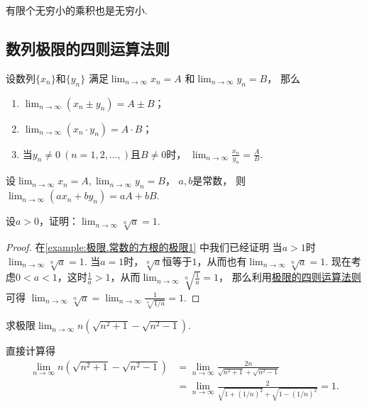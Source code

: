 \begin{corollary}
有限个无穷小的乘积也是无穷小.
\end{corollary}

\subsection{数列极限的四则运算法则}
\begin{theorem}\label{theorem:极限.数列极限的四则运算法则}
设数列\(\{x_n\}\)和\(\{y_n\}\)
满足\(\lim_{n\to\infty} x_n = A\)
和\(\lim_{n\to\infty} y_n = B\)，
那么\begin{enumerate}
	\item \(\lim_{n\to\infty} (x_n \pm y_n) = A \pm B\)；
	\item \(\lim_{n\to\infty} (x_n \cdot y_n) = A \cdot B\)；
	\item 当\(y_n \neq 0\ (n=1,2,\dotsc,)\)且\(B \neq 0\)时，
	\(\lim_{n\to\infty}{\frac{x_n}{y_n}}=\frac{A}{B}\).
\end{enumerate}
\end{theorem}

\begin{corollary}
设\(\lim_{n\to\infty} x_n = A,
\lim_{n\to\infty} y_n = B\)，
\(a,b\)是常数，
则\(\lim_{n\to\infty} (a x_n + b y_n) = a A + b B\).
\end{corollary}

\begin{example}
设\(a>0\)，证明：\(\lim_{n\to\infty} \sqrt[n]{a} = 1\).
\begin{proof}
在\cref{example:极限.常数的方根的极限1} 中我们已经证明
当\(a>1\)时\(\lim_{n\to\infty} \sqrt[n]{a} = 1\).
当\(a=1\)时，\(\sqrt[n]{a}\)恒等于\(1\)，从而也有\(\lim_{n\to\infty} \sqrt[n]{a} = 1\).
现在考虑\(0<a<1\)，这时\(\frac1a>1\)，从而\(\lim_{n\to\infty} \sqrt[n]{\frac1a} = 1\)，
那么利用\hyperref[theorem:极限.数列极限的四则运算法则]{极限的四则运算法则}可得
\(\lim_{n\to\infty} \sqrt[n]{a}
= \lim_{n\to\infty} \frac1{\sqrt[n]{1/a}} = 1\).
\end{proof}
\end{example}

\begin{example}
求极限\(\lim_{n\to\infty} n(\sqrt{n^2+1}-\sqrt{n^2-1})\).
\begin{solution}
直接计算得\begin{align*}
	\lim_{n\to\infty} n(\sqrt{n^2+1}-\sqrt{n^2-1})
	&= \lim_{n\to\infty} \frac{2n}{\sqrt{n^2+1}+\sqrt{n^2-1}} \\
	&= \lim_{n\to\infty} \frac2{\sqrt{1+(1/n)^2}+\sqrt{1-(1/n)^2}}
	= 1.
\end{align*}
\end{solution}
\end{example}

